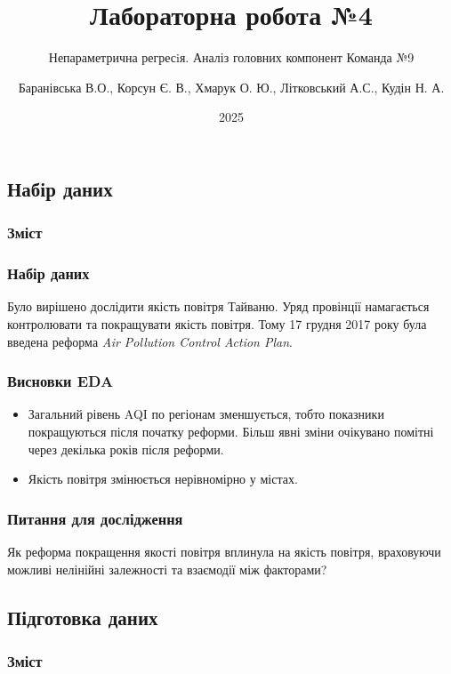 ﻿\documentclass{beamer}
\title{Лабораторна робота №4}
\subtitle{Непараметрична регресiя. Аналіз головних компонент }
\subtitle{Команда №9}
\author[]{
  Баранівська В.О.,
  Корсун Є. В.,
  Хмарук О. Ю.,
  Літковський А.С.,
  Кудін Н. А.
}
\date{2025}
\begin{document}
\frame{\titlepage}

\graphicspath{{../../../}} %


\begin{frame}
  \section{Набір даних}

  \frametitle{Зміст}
  \tableofcontents[currentsection]
\end{frame}

\begin{frame}
  \frametitle{Набір даних}

  Було вирішено дослідити якість повітря Тайваню. Уряд провінції намагається
  контролювати та покращувати якість повітря. Тому 17 грудня 2017 року була введена
  реформа \textit{Air Pollution Control Action Plan}.

  \begin{center}

  \end{center}
\end{frame}

\begin{frame}
  \frametitle{Висновки EDA}
  \begin{itemize}
    \item Загальний рівень AQI по регіонам зменшується, тобто показники покращуються після початку реформи.
    Більш явні зміни очікувано помітні через декілька років після реформи.
    \item Якість повітря змінюється нерівномірно у містах.
  \end{itemize}
\end{frame}

\begin{frame}
  \frametitle{Питання для дослідження}
  Як реформа покращення якості повітря вплинула на якість повітря,
  враховуючи можливі нелінійні залежності та взаємодії між факторами?
\end{frame}

\begin{frame}
  \section{Підготовка даних}

  \frametitle{Зміст}
  \tableofcontents[currentsection]
\end{frame}
\end{document}
